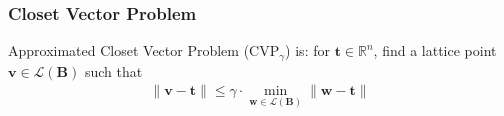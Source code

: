 \subsubsection{Closet Vector Problem}
\par Approximated Closet Vector Problem (CVP$_{\gamma}$) is: for $\mathbf{t} \in \mathbb{R}^{n}$, find a lattice point $\mathbf{v}\in \mathcal{L}(\mathbf{B})$ such that
\begin{align*}
\| \mathbf{v} - \mathbf{t}\| \leq \gamma \cdot \min_{\mathbf{w}\in \mathcal{L}(\mathbf{B})} \|\mathbf{w} - \mathbf{t}\|
\end{align*}